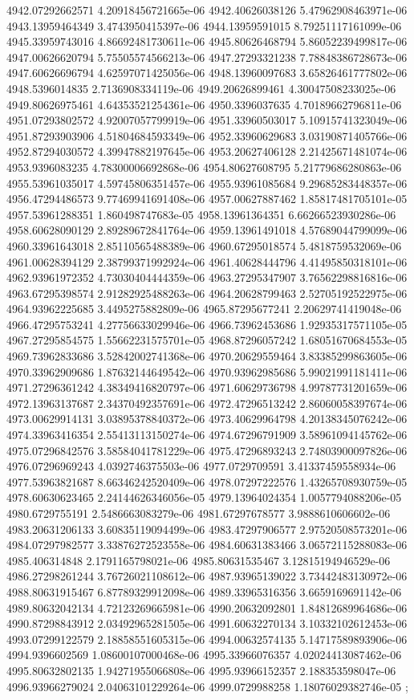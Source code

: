 {4942.07292662571 4.20918456721665e-06
4942.40626038126 5.47962908463971e-06
4943.13959464349 3.4743950415397e-06
4944.13959591015 8.79251117161099e-06
4945.33959743016 4.86692481730611e-06
4945.80626468794 5.86052239499817e-06
4947.00626620794 5.75505574566213e-06
4947.27293321238 7.78848386728673e-06
4947.60626696794 4.62597071425056e-06
4948.13960097683 3.65826461777802e-06
4948.5396014835 2.7136908334119e-06
4949.20626899461 4.30047508233025e-06
4949.80626975461 4.64353521254361e-06
4950.3396037635 4.70189662796811e-06
4951.07293802572 4.92007057799919e-06
4951.33960503017 5.10915741323049e-06
4951.87293903906 4.51804684593349e-06
4952.33960629683 3.03190871405766e-06
4952.87294030572 4.39947882197645e-06
4953.20627406128 2.21425671481074e-06
4953.9396083235 4.78300006692868e-06
4954.80627608795 5.21779686280863e-06
4955.53961035017 4.59745806351457e-06
4955.93961085684 9.29685283448357e-06
4956.47294486573 9.77469941691408e-06
4957.00627887462 1.85817481705101e-05
4957.53961288351 1.860498747683e-05
4958.13961364351 6.66266523930286e-06
4958.60628090129 2.89289672841764e-06
4959.13961491018 4.57689044799099e-06
4960.33961643018 2.85110565488389e-06
4960.67295018574 5.4818759532069e-06
4961.00628394129 2.38799371992924e-06
4961.40628444796 4.41495850318101e-06
4962.93961972352 4.73030404444359e-06
4963.27295347907 3.76562298816816e-06
4963.67295398574 2.91282925488263e-06
4964.20628799463 2.52705192522975e-06
4964.93962225685 3.4495275882809e-06
4965.87295677241 2.20629741419048e-06
4966.47295753241 4.27756633029946e-06
4966.73962453686 1.92935317571105e-05
4967.27295854575 1.55662231575701e-05
4968.87296057242 1.68051670684553e-05
4969.73962833686 3.52842002741368e-06
4970.20629559464 3.83385299863605e-06
4970.33962909686 1.87632144649542e-06
4970.93962985686 5.99021991181411e-06
4971.27296361242 4.38349416820797e-06
4971.60629736798 4.99787731201659e-06
4972.13963137687 2.34370492357691e-06
4972.47296513242 2.86060058397674e-06
4973.00629914131 3.03895378840372e-06
4973.40629964798 4.20138345076242e-06
4974.33963416354 2.55413113150274e-06
4974.67296791909 3.58961094145762e-06
4975.07296842576 3.58584041781229e-06
4975.47296893243 2.74803900097826e-06
4976.07296969243 4.0392746375503e-06
4977.0729709591 3.41337459558934e-06
4977.53963821687 8.66346242520409e-06
4978.07297222576 1.43265708930759e-05
4978.60630623465 2.24144626346056e-05
4979.13964024354 1.0057794088206e-05
4980.6729755191 2.5486663083279e-06
4981.67297678577 3.9888610606602e-06
4983.20631206133 3.60835119094499e-06
4983.47297906577 2.97520508573201e-06
4984.07297982577 3.33876272523558e-06
4984.60631383466 3.06572115288083e-06
4985.406314848 2.1791165798021e-06
4985.80631535467 3.12815194946529e-06
4986.27298261244 3.76726021108612e-06
4987.93965139022 3.73442483130972e-06
4988.80631915467 6.87789329912098e-06
4989.33965316356 3.6659169691142e-06
4989.80632042134 4.72123269665981e-06
4990.20632092801 1.84812689964686e-06
4990.87298843912 2.03492965281505e-06
4991.60632270134 3.10332102612453e-06
4993.07299122579 2.18858551605315e-06
4994.00632574135 5.14717589893906e-06
4994.9396602569 1.08600107000468e-06
4995.33966076357 4.02024413087462e-06
4995.80632802135 1.94271955066808e-06
4995.93966152357 2.188353598047e-06
4996.93966279024 2.04063101229264e-06
4999.0729988258 1.18076029382746e-05
};
